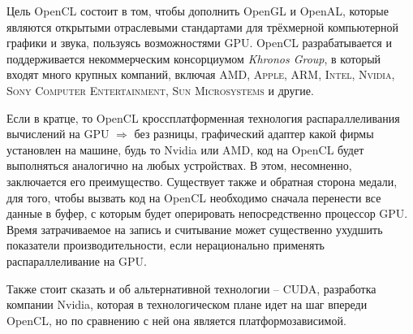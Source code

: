 \documentclass[utf8, 12pt, a4paper, oneside]{article}
\begin{document}
Цель OpenCL состоит в том, чтобы дополнить OpenGL и OpenAL, которые являются открытыми отраслевыми стандартами для трёхмерной компьютерной графики и звука, пользуясь возможностями GPU. OpenCL разрабатывается и поддерживается некоммерческим консорциумом \textit{Khronos Group}, в который входят много крупных компаний, включая \textsc{AMD, Apple, ARM, Intel, Nvidia, Sony Computer Entertainment, Sun Microsystems} и другие.

Если в кратце, то OpenCL кроссплатформенная технология распараллеливания вычислений на GPU $\Rightarrow$ без разницы, графический адаптер какой фирмы установлен на машине, будь то Nvidia или AMD, код на OpenCL будет выполняться аналогично на любых устройствах. В этом, несомненно, заключается его преимущество. Существует также и обратная сторона медали, для того, чтобы вызвать код на OpenCL необходимо сначала перенести все данные в буфер, с которым будет оперировать непосредственно процессор GPU. Время затрачиваемое на запись и считывание может существенно ухудшить показатели производительности, если нерационально применять распараллеливание на GPU.

Также стоит сказать и об альтернативной технологии -- CUDA, разработка компании Nvidia, которая в технологическом плане идет на шаг впереди OpenCL, но по сравнению с ней она является платформозависимой.
\end{document}
